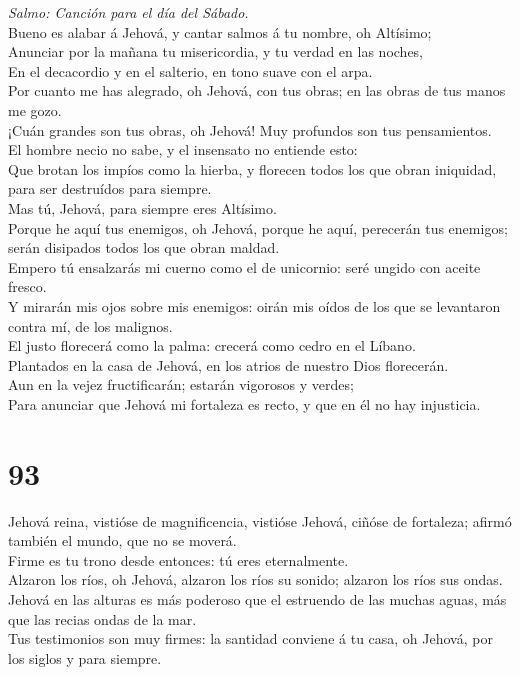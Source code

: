  \emph{Salmo: Canción para el día del Sábado.}\\
Bueno es alabar á Jehová, y cantar salmos á tu nombre, oh Altísimo;\\
 Anunciar por la mañana tu misericordia, y tu verdad en las
noches,\\
 En el decacordio y en el salterio, en tono suave con el
arpa.\\
 Por cuanto me has alegrado, oh Jehová, con tus obras; en
las obras de tus manos me gozo.\\
 ¡Cuán grandes son tus obras, oh Jehová! Muy profundos son
tus pensamientos.\\
 El hombre necio no sabe, y el insensato no entiende esto:\\
 Que brotan los impíos como la hierba, y florecen todos los
que obran iniquidad, para ser destruídos para siempre.\\
 Mas tú, Jehová, para siempre eres Altísimo.\\
 Porque he aquí tus enemigos, oh Jehová, porque he aquí,
perecerán tus enemigos; serán disipados todos los que obran maldad.\\
 Empero tú ensalzarás mi cuerno como el de unicornio: seré
ungido con aceite fresco.\\
 Y mirarán mis ojos sobre mis enemigos: oirán mis oídos de
los que se levantaron contra mí, de los malignos.\\
 El justo florecerá como la palma: crecerá como cedro en el
Líbano.\\
 Plantados en la casa de Jehová, en los atrios de nuestro
Dios florecerán.\\
 Aun en la vejez fructificarán; estarán vigorosos y
verdes;\\
 Para anunciar que Jehová mi fortaleza es recto, y que en
él no hay injusticia.

\hypertarget{section-92}{%
\section{93}\label{section-92}}

 Jehová reina, vistióse de magnificencia, vistióse Jehová,
ciñóse de fortaleza; afirmó también el mundo, que no se moverá.\\
 Firme es tu trono desde entonces: tú eres eternalmente.\\
 Alzaron los ríos, oh Jehová, alzaron los ríos su sonido;
alzaron los ríos sus ondas.\\
 Jehová en las alturas es más poderoso que el estruendo de
las muchas aguas, más que las recias ondas de la mar.\\
 Tus testimonios son muy firmes: la santidad conviene á tu
casa, oh Jehová, por los siglos y para siempre.

